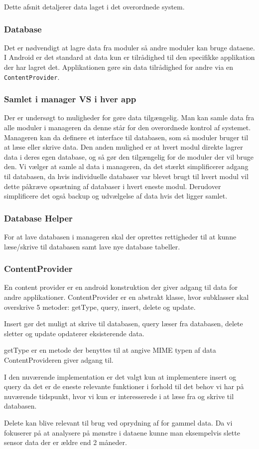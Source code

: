 Dette afsnit detaljerer data laget i det overordnede system. 

\subsubsection{Database}
Det er nødvendigt at lagre data fra moduler så andre moduler kan bruge dataene.
I Android er det standard at data kun er tilrådighed til den specifikke applikation der har lagret det.
Applikationen gøre sin data tilrådighed for andre via en \texttt{ContentProvider}.

\subsubsection{Samlet i manager VS i hver app}
Der er undersøgt to muligheder for gøre data tilgængelig.
Man kan samle data fra alle moduler i manageren da denne står for den overordnede kontrol af systemet. 
Manageren kan da definere et interface til databasen, som så moduler bruger til at læse eller skrive data. 
Den anden mulighed er at hvert modul direkte lagrer data i deres egen database, og så gør den tilgængelig for de moduler der vil bruge den.
Vi vælger at samle al data i manageren, da det stærkt simplificerer adgang til databasen, da hvis individuelle databaser var blevet brugt til hvert modul vil dette påkræve opsætning af databaser i hvert eneste modul.
Derudover simplificere det også backup og udvælgelse af data hvis det ligger samlet.

\subsubsection{Database Helper}
For at lave databasen i manageren skal der oprettes rettigheder til at kunne læse/skrive til databasen samt lave nye database tabeller.

\subsubsection{ContentProvider}
En content provider er en android konstruktion der giver adgang til data for andre applikationer.
ContentProvider er en abstrakt klasse, hvor subklasser skal overskrive 5 metoder:  getType, query, insert, delete og update. \cite{contentprovider}

Insert gør det muligt at skrive til databasen, query læser fra databasen, delete sletter og update opdaterer eksisterende data.

getType er en metode der benyttes til at angive MIME typen af data ContentProvideren giver adgang til.

I den nuværende implementation er det valgt kun at implementere insert og query da det er de eneste relevante funktioner i forhold til det behov vi har på nuværende tidspunkt, hvor vi kun er interesserede i at læse fra og skrive til databasen.

Delete kan blive relevant til brug ved oprydning af for gammel data. Da vi fokuserer på at analysere på mønstre i dataene kunne man eksempelvis slette sensor data der er ældre end 2 måneder. 
